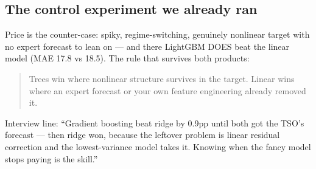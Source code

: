 \subsection{The control experiment we already ran}

Price is the counter-case: spiky, regime-switching, genuinely nonlinear
target with no expert forecast to lean on --- and there LightGBM DOES
beat the linear model (MAE 17.8 vs 18.5). The rule that survives both
products:

\begin{quote}
Trees win where nonlinear structure survives in the target. Linear wins
where an expert forecast or your own feature engineering already
removed it.
\end{quote}

Interview line: ``Gradient boosting beat ridge by 0.9pp until both got
the TSO's forecast --- then ridge won, because the leftover problem is
linear residual correction and the lowest-variance model takes it.
Knowing when the fancy model stops paying is the skill.''

